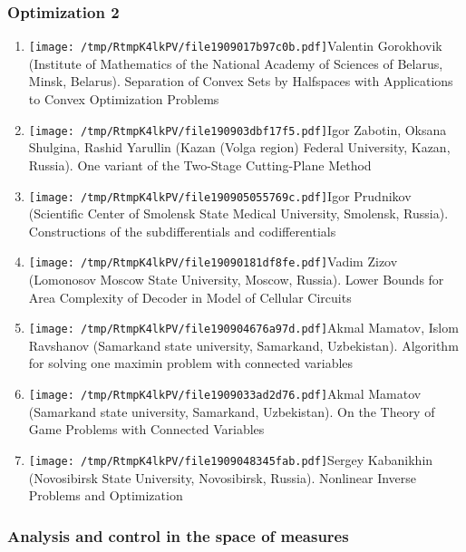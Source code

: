 \documentclass[
]{article}
\providecommand{\tightlist}{%
  \setlength{\itemsep}{0pt}\setlength{\parskip}{0pt}}
\begin{document}
\hypertarget{o2}{%
\subsubsection{Optimization 2}\label{o2}}

\begin{enumerate}
\def\labelenumi{\arabic{enumi}.}
\tightlist
\item
  \protect\texttt{[image: /tmp/RtmpK4lkPV/file1909017b97c0b.pdf]}Valentin
  Gorokhovik (Institute of Mathematics of the National Academy of
  Sciences of Belarus, Minsk, Belarus). Separation of Convex Sets by
  Halfspaces with Applications to Convex Optimization Problems
\item
  \protect\texttt{[image: /tmp/RtmpK4lkPV/file190903dbf17f5.pdf]}Igor
  Zabotin, Oksana Shulgina, Rashid Yarullin (Kazan (Volga region)
  Federal University, Kazan, Russia). One variant of the Two-Stage
  Cutting-Plane Method
\item
  \protect\texttt{[image: /tmp/RtmpK4lkPV/file190905055769c.pdf]}Igor
  Prudnikov (Scientific Center of Smolensk State Medical University,
  Smolensk, Russia). Constructions of the subdifferentials and
  codifferentials
\item
  \protect\texttt{[image: /tmp/RtmpK4lkPV/file19090181df8fe.pdf]}Vadim
  Zizov (Lomonosov Moscow State University, Moscow, Russia). Lower
  Bounds for Area Complexity of Decoder in Model of Cellular Circuits
\item
  \protect\texttt{[image: /tmp/RtmpK4lkPV/file190904676a97d.pdf]}Akmal
  Mamatov, Islom Ravshanov (Samarkand state university, Samarkand,
  Uzbekistan). Algorithm for solving one maximin problem with connected
  variables
\item
  \protect\texttt{[image: /tmp/RtmpK4lkPV/file1909033ad2d76.pdf]}Akmal
  Mamatov (Samarkand state university, Samarkand, Uzbekistan). On the
  Theory of Game Problems with Connected Variables
\item
  \protect\texttt{[image: /tmp/RtmpK4lkPV/file1909048345fab.pdf]}Sergey
  Kabanikhin (Novosibirsk State University, Novosibirsk, Russia).
  Nonlinear Inverse Problems and Optimization
\end{enumerate}

\hypertarget{meas}{%
\subsubsection{Analysis and control in the space of
measures}\label{meas}}
\end{document}
